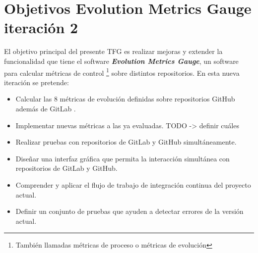 \section{Objetivos Evolution Metrics Gauge iteración 2}
   
El objetivo principal del presente TFG es realizar mejoras y extender la funcionalidad que tiene el software \textit{\textbf{Evolution Metrics Gauge}}, un software para calcular métricas de control \footnote{También llamadas métricas de proceso o métricas de evolución} sobre distintos repositorios.
En esta nueva iteración se pretende:

\begin{itemize}
	\tightlist
	\item Calcular las 8 métricas de evolución definidas sobre repositorios GitHub además de GitLab .
	\item Implementar nuevas métricas a las ya evaluadas. TODO -> definir cuáles
	\item Realizar pruebas con repositorios de GitLab y GitHub simultáneamente.
	\item Diseñar una interfaz gráfica que permita la interacción simultánea con repositorios de GitLab y GitHub.
	\item Comprender y aplicar el flujo de trabajo de integración continua del proyecto actual.
	\item Definir un conjunto de pruebas que ayuden a detectar errores de la versión actual.
\end{itemize}

\newpage


